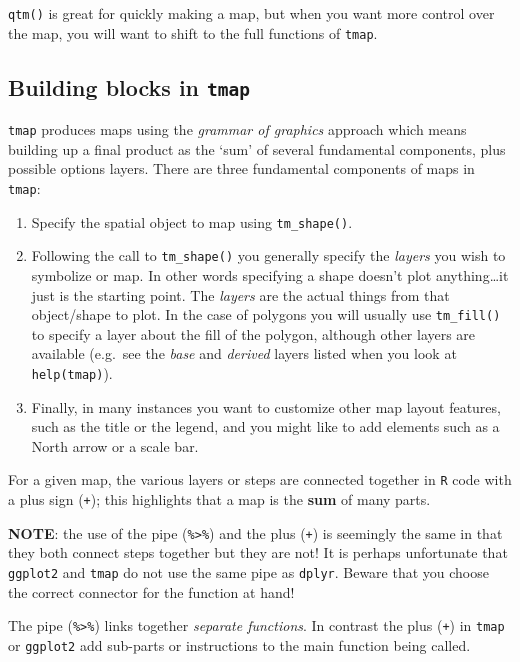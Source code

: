 \documentclass[
]{book}
\providecommand{\tightlist}{%
  \setlength{\itemsep}{0pt}\setlength{\parskip}{0pt}}
\newenvironment{rmdnote}[1]
  {
  \begin{itemize}
  \renewcommand{\labelitemi}{
    \raisebox{-.7\height}[0pt][0pt]{
      {\setkeys{Gin}{width=3em,keepaspectratio}\texttt{[image: images/\#1]}}
    }
  }
  \setlength{\fboxsep}{1em}
  \begin{note}
  \item
  }
  {
  \end{note}
  \end{itemize}
  }
\begin{document}
\texttt{qtm()} is great for quickly making a map, but when you want more control over the map, you will want to shift to the full functions of \texttt{tmap}.

\hypertarget{building-blocks-in-tmap}{%
\subsection{\texorpdfstring{Building blocks in \texttt{tmap}}{Building blocks in tmap}}\label{building-blocks-in-tmap}}

\texttt{tmap} produces maps using the \emph{grammar of graphics} approach which means building up a final product as the `sum' of several fundamental components, plus possible options layers. There are three fundamental components of maps in \texttt{tmap}:

\begin{enumerate}
\def\labelenumi{\arabic{enumi}.}
\tightlist
\item
  Specify the spatial object to map using \texttt{tm\_shape()}.
\item
  Following the call to \texttt{tm\_shape()} you generally specify the \emph{layers} you wish to symbolize or map. In other words specifying a shape doesn't plot anything\ldots it just is the starting point. The \emph{layers} are the actual things from that object/shape to plot. In the case of polygons you will usually use \texttt{tm\_fill()} to specify a layer about the fill of the polygon, although other layers are available (e.g.~see the \emph{base} and \emph{derived} layers listed when you look at \texttt{help(\textquotesingle{}tmap\textquotesingle{})}).
\item
  Finally, in many instances you want to customize other map layout features, such as the title or the legend, and you might like to add elements such as a North arrow or a scale bar.
\end{enumerate}

For a given map, the various layers or steps are connected together in \texttt{R} code with a plus sign (\texttt{+}); this highlights that a map is the \textbf{sum} of many parts.

\begin{rmdnote}{note}
\textbf{NOTE}: the use of the pipe (\texttt{\%\textgreater{}\%}) and the plus (\texttt{+}) is seemingly the same in that they both connect steps together but they are not! It is perhaps unfortunate that \texttt{ggplot2} and \texttt{tmap} do not use the same pipe as \texttt{dplyr}. Beware that you choose the correct connector for the function at hand!

The pipe (\texttt{\%\textgreater{}\%}) links together \emph{separate functions}. In contrast the plus (\texttt{+}) in \texttt{tmap} or \texttt{ggplot2} add sub-parts or instructions to the main function being called.

\end{rmdnote}
\end{document}
